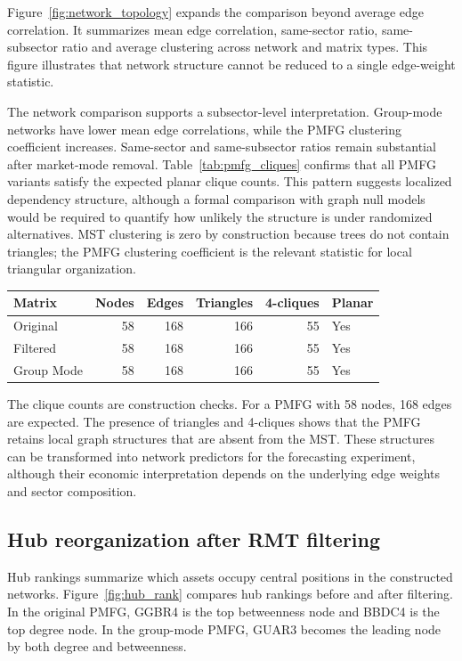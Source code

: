 Figure~\ref{fig:network_topology} expands the comparison beyond average edge correlation. It summarizes mean edge correlation, same-sector ratio, same-subsector ratio and average clustering across network and matrix types. This figure illustrates that network structure cannot be reduced to a single edge-weight statistic.

The network comparison supports a subsector-level interpretation. Group-mode networks have lower mean edge correlations, while the PMFG clustering coefficient increases. Same-sector and same-subsector ratios remain substantial after market-mode removal. Table~\ref{tab:pmfg_cliques} confirms that all PMFG variants satisfy the expected planar clique counts. This pattern suggests localized dependency structure, although a formal comparison with graph null models would be required to quantify how unlikely the structure is under randomized alternatives. MST clustering is zero by construction because trees do not contain triangles; the PMFG clustering coefficient is the relevant statistic for local triangular organization.

\begin{center}
\label{tab:pmfg_cliques}
\begin{tabular}{lrrrrl}
\toprule
Matrix & Nodes & Edges & Triangles & 4-cliques & Planar \\
\midrule
Original & 58 & 168 & 166 & 55 & Yes \\
Filtered & 58 & 168 & 166 & 55 & Yes \\
Group Mode & 58 & 168 & 166 & 55 & Yes \\
\bottomrule
\end{tabular}
\end{center}
\GlobalPrecisionNote

The clique counts are construction checks. For a PMFG with 58 nodes, 168 edges are expected. The presence of triangles and 4-cliques shows that the PMFG retains local graph structures that are absent from the MST. These structures can be transformed into network predictors for the forecasting experiment, although their economic interpretation depends on the underlying edge weights and sector composition.

\subsection{Hub reorganization after RMT filtering}

Hub rankings summarize which assets occupy central positions in the constructed networks. Figure~\ref{fig:hub_rank} compares hub rankings before and after filtering. In the original PMFG, GGBR4 is the top betweenness node and BBDC4 is the top degree node. In the group-mode PMFG, GUAR3 becomes the leading node by both degree and betweenness.

